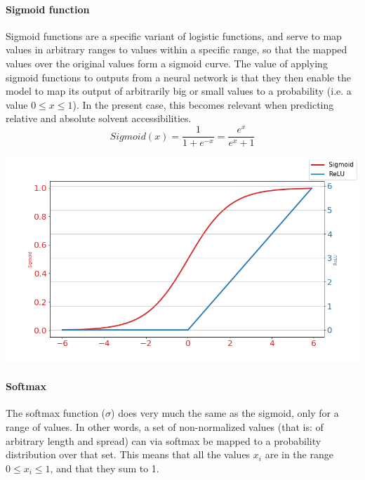 \begin{multicols}{2}
\paragraph{Sigmoid function}
Sigmoid functions are a specific variant of logistic functions, and serve to map values in arbitrary ranges to values within a specific range, so that the mapped values over the original values form a sigmoid curve. The value of applying sigmoid functions to outputs from a neural network is that they then enable the model to map its output of arbitrarily big or small values to a probability (i.e. a value $0\leq x \leq 1$). In the present case, this becomes relevant when predicting relative and absolute solvent accessibilities.
\[
Sigmoid(x) = \frac{1}{1 + e^{-x}} = \frac{e^x}{e^x +1}
\]

\begin{Figure}
 \centering
 \includegraphics[width=\linewidth]{../graphs/activation.png}
 \captionsetup{width=0.8\linewidth, font=small}
\end{Figure}



\paragraph{Softmax}
The softmax function ($\sigma$) does very much the same as the sigmoid, only for a range of values. In other words, a set of non-normalized values (that is: of arbitrary length and spread) can via softmax be mapped to a probability distribution over that set. This means that all the values $x_i$ are in the range $0\leq x_i \leq 1$, and that they sum to 1.


\end{multicols}

